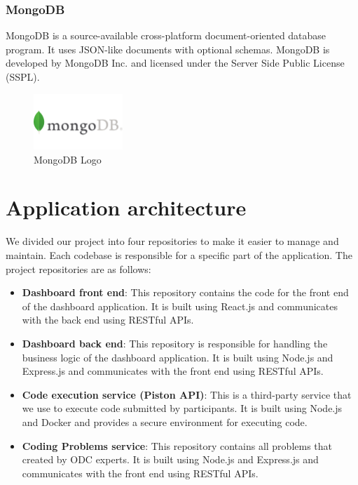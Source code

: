 \subsubsection{MongoDB}
MongoDB is a source-available cross-platform document-oriented database program.
It uses JSON-like documents with optional schemas. MongoDB is developed by
MongoDB Inc. and licensed under the Server Side Public License (SSPL).
\begin{figure}[h!]
      \centering
      \includegraphics[width=0.3\textwidth]{images/mongodb.png}
      \caption{MongoDB Logo}
      \label{fig:mongodb}
\end{figure}

\bigbreak
\section{Application architecture}
We divided our project into four repositories to make it easier to manage and
maintain. Each codebase is responsible for a specific part of the application.
The project repositories are as follows:

\begin{itemize}
      \item \textbf{Dashboard front end}: This repository contains the code for the
            front end of the dashboard application. It is built using React.js and
            communicates with the back end using RESTful APIs.

      \item \textbf{Dashboard back end}: This repository is responsible for handling the
            business logic of the dashboard application. It is built using Node.js
            and Express.js and communicates with the front end using RESTful APIs.

      \item \textbf{Code execution service (Piston API)}: This is a third-party service
            that we use to execute code submitted by participants. It is built
            using Node.js and Docker and provides a secure environment for
            executing code.

      \item \textbf{Coding Problems service}: This repository contains all problems that created
            by ODC experts. It is built using Node.js and Express.js and communicates with
            the front end using RESTful APIs.
\end{itemize}


